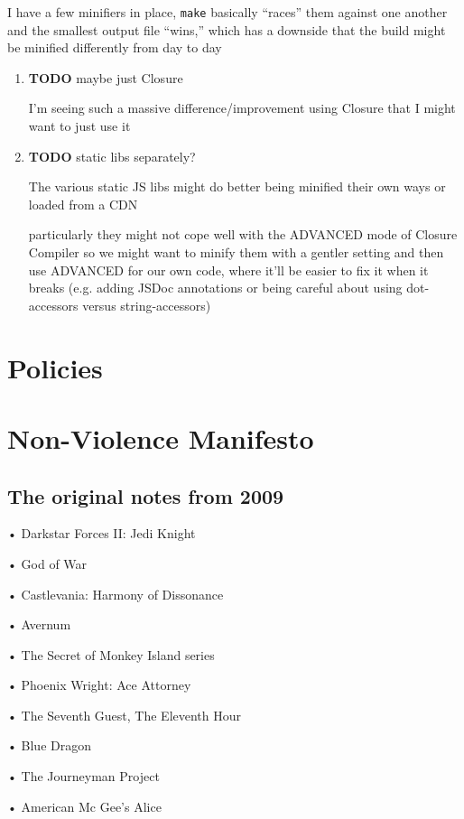 \documentclass[11pt]{article}
\begin{document}
\begin{enumerate}
I have a few minifiers in place, \texttt{make} basically “races” them
against one another and the smallest output file “wins,” which has a
downside that the build might be minified differently from day to day

\begin{enumerate}
\item {\bfseries\sffamily TODO} maybe just Closure
\label{sec-5-4-4-1}

I'm seeing such a massive difference/improvement using Closure that I
might want to just use it
\item {\bfseries\sffamily TODO} static libs separately?
\label{sec-5-4-4-2}

The various static JS libs might do better being minified their own
ways or loaded from a CDN

particularly they might not cope well with the ADVANCED mode of
Closure Compiler so we might want to minify them with a gentler
setting and then use ADVANCED for our own code, where it'll be easier
to fix it when it breaks (e.g. adding JSDoc annotations or being
careful about using dot-accessors versus string-accessors)
\end{enumerate}
\section{Policies}
\label{sec-6}
\section{Non-Violence Manifesto}
\label{sec-7}

\subsection{The original notes from 2009}
\label{sec-7-1}

• Darkstar Forces II: Jedi Knight

• God of War

• Castlevania: Harmony of Dissonance

• Avernum

• The Secret of Monkey Island series

• Phoenix Wright: Ace Attorney

• The Seventh Guest, The Eleventh Hour

• Blue Dragon

• The Journeyman Project

• American Mc Gee’s Alice


\end{enumerate}
\end{document}
